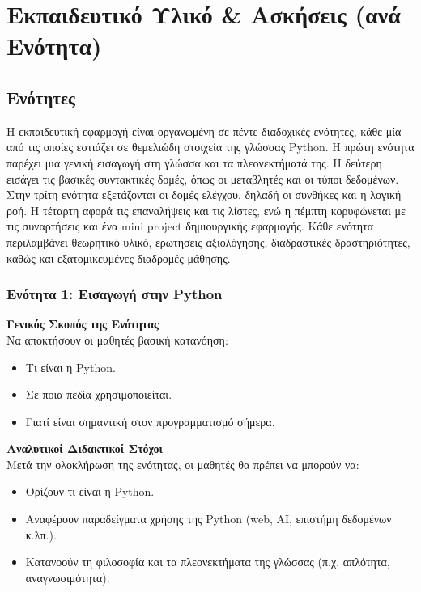 \documentclass[11pt]{report}
\begin{document}
\chapter{Εκπαιδευτικό Υλικό \& Ασκήσεις (ανά Ενότητα)}
\section{Ενότητες}
Η εκπαιδευτική εφαρμογή είναι οργανωμένη σε πέντε διαδοχικές ενότητες, κάθε μία από τις οποίες εστιάζει σε θεμελιώδη στοιχεία της γλώσσας Python. Η πρώτη ενότητα παρέχει μια γενική εισαγωγή στη γλώσσα και τα πλεονεκτήματά της. Η δεύτερη εισάγει τις βασικές συντακτικές δομές, όπως οι μεταβλητές και οι τύποι δεδομένων. Στην τρίτη ενότητα εξετάζονται οι δομές ελέγχου, δηλαδή οι συνθήκες και η λογική ροή. Η τέταρτη αφορά τις επαναλήψεις και τις λίστες, ενώ η πέμπτη κορυφώνεται με τις συναρτήσεις και ένα mini project δημιουργικής εφαρμογής. Κάθε ενότητα περιλαμβάνει θεωρητικό υλικό, ερωτήσεις αξιολόγησης, διαδραστικές δραστηριότητες, καθώς και εξατομικευμένες διαδρομές μάθησης. 

\subsection{Ενότητα 1: Εισαγωγή στην Python}

\textbf{Γενικός Σκοπός της Ενότητας} \\[0.5em]
Να αποκτήσουν οι μαθητές βασική κατανόηση:

\begin{itemize}
    \item Τι είναι η Python.
    \item Σε ποια πεδία χρησιμοποιείται.
    \item Γιατί είναι σημαντική στον προγραμματισμό σήμερα.
\end{itemize}

\vspace{1em}
\textbf{Αναλυτικοί Διδακτικοί Στόχοι} \\[0.5em]
Μετά την ολοκλήρωση της ενότητας, οι μαθητές θα πρέπει να μπορούν να:

\begin{itemize}
    \item Ορίζουν τι είναι η Python.
    \item Αναφέρουν παραδείγματα χρήσης της Python (web, AI, επιστήμη δεδομένων κ.λπ.).
    \item Κατανοούν τη φιλοσοφία και τα πλεονεκτήματα της γλώσσας (π.χ. απλότητα, αναγνωσιμότητα).
\end{itemize}
\end{document}
